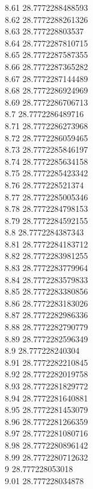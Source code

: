{8.61	28.7772288488593\\
8.62	28.7772288261326\\
8.63	28.777228803537\\
8.64	28.7772287810715\\
8.65	28.7772287587355\\
8.66	28.7772287365282\\
8.67	28.7772287144489\\
8.68	28.7772286924969\\
8.69	28.7772286706713\\
8.7	28.7772286489716\\
8.71	28.7772286273968\\
8.72	28.7772286059465\\
8.73	28.7772285846197\\
8.74	28.7772285634158\\
8.75	28.7772285423342\\
8.76	28.777228521374\\
8.77	28.7772285005346\\
8.78	28.7772284798153\\
8.79	28.7772284592155\\
8.8	28.7772284387343\\
8.81	28.7772284183712\\
8.82	28.7772283981255\\
8.83	28.7772283779964\\
8.84	28.7772283579833\\
8.85	28.7772283380856\\
8.86	28.7772283183026\\
8.87	28.7772282986336\\
8.88	28.7772282790779\\
8.89	28.7772282596349\\
8.9	28.777228240304\\
8.91	28.7772282210845\\
8.92	28.7772282019758\\
8.93	28.7772281829772\\
8.94	28.7772281640881\\
8.95	28.7772281453079\\
8.96	28.7772281266359\\
8.97	28.7772281080716\\
8.98	28.7772280896142\\
8.99	28.7772280712632\\
9	28.777228053018\\
9.01	28.777228034878\\
}

